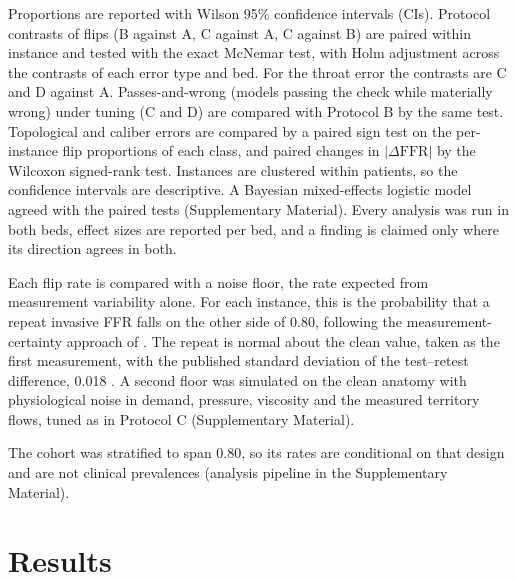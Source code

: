 \documentclass[journal,twoside,web]{ieeecolor}
\begin{document}
Proportions are reported with Wilson 95\% confidence intervals (CIs). Protocol contrasts of flips (B against A, C against A, C against B) are paired within instance and tested with the exact McNemar test, with Holm adjustment across the contrasts of each error type and bed. For the throat error the contrasts are C and D against A. Passes-and-wrong (models passing the check while materially wrong) under tuning (C and D) are compared with Protocol B by the same test. Topological and caliber errors are compared by a paired sign test on
the per-instance flip proportions of each class, and paired changes in $|\Delta\mathrm{FFR}|$ by the Wilcoxon
signed-rank test. Instances are clustered within patients, so the confidence intervals are descriptive. A Bayesian mixed-effects logistic model agreed with the paired tests (Supplementary Material). Every analysis was run in both beds, effect sizes are reported per bed, and a finding is
claimed only where its direction agrees in both.

Each flip rate is compared with a noise floor, the rate expected from measurement variability alone. For each instance, this is the probability that a repeat invasive FFR falls on the other side of 0.80, following the measurement-certainty approach of \cite{petraco2013}. The repeat is normal about the clean value, taken as the first measurement, with the published standard deviation of the test--retest difference, 0.018 \cite{johnson2015}. A second floor was simulated on the clean anatomy with physiological
noise in demand, pressure, viscosity and the measured territory flows, tuned as in Protocol C (Supplementary Material).

The cohort was stratified to span 0.80, so its rates are conditional on that design and are not clinical prevalences (analysis pipeline in the Supplementary Material).

\section{Results}
\end{document}
